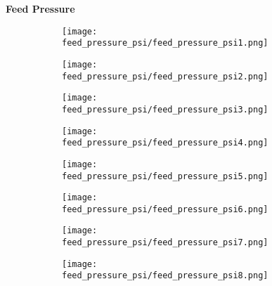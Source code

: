 \documentclass{article}
\begin{document}
    \textbf{Feed Pressure}
    \begin{figure}[H]
        \centering
        \begin{subfigure}{0.48\linewidth}
		    \texttt{[image: feed\_pressure\_psi/feed\_pressure\_psi1.png]}
	    \end{subfigure}
	    \begin{subfigure}{0.48\linewidth}
		    \texttt{[image: feed\_pressure\_psi/feed\_pressure\_psi2.png]}
	    \end{subfigure}
	    \begin{subfigure}{0.48\linewidth}
		    \texttt{[image: feed\_pressure\_psi/feed\_pressure\_psi3.png]}
	    \end{subfigure}
	    \begin{subfigure}{0.48\linewidth}
		    \texttt{[image: feed\_pressure\_psi/feed\_pressure\_psi4.png]}
	    \end{subfigure}
	    \begin{subfigure}{0.48\linewidth}
		    \texttt{[image: feed\_pressure\_psi/feed\_pressure\_psi5.png]}
	    \end{subfigure}
	    \begin{subfigure}{0.48\linewidth}
		    \texttt{[image: feed\_pressure\_psi/feed\_pressure\_psi6.png]}
	    \end{subfigure}
	    \begin{subfigure}{0.48\linewidth}
		    \texttt{[image: feed\_pressure\_psi/feed\_pressure\_psi7.png]}
	    \end{subfigure}
	    \begin{subfigure}{0.48\linewidth}
		    \texttt{[image: feed\_pressure\_psi/feed\_pressure\_psi8.png]}
	    \end{subfigure}
    \end{figure}
    
    \pagebreak
    
\end{document}
